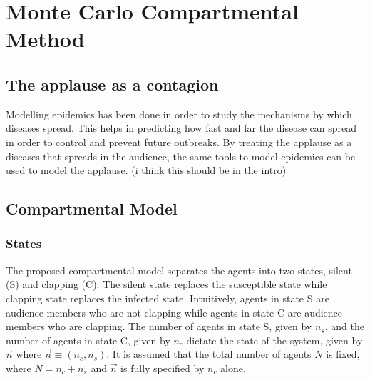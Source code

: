 \chapter{Monte Carlo Compartmental Method}
\label{chap2}
\def\a{(n \pi p)}
\def\aa{(\bar{n} \pi p)}
\def\b{kpL}
\def\c{k(1-p)L}
\def\s{\\sin{(\bar{n}\pi p)}}
\def\c{\\cos{(\bar{n}\pi p)}}
\def\statepsi{\mid \psi \; \rangle}
\def\energy{\mid E_{\vec{k}} \; \rangle}
\def\psixt{\mid \psi(x,t) \; \rangle}
\def\statepsixtrev{\mid \psi(x,t=T_{rev}) \; \rangle}
\def\statepsixt0{\mid \psi(x,t=0) \; \rangle}
\def\lowering{S^-_l \mid 0 \; \rangle}
\def\loweringa{S^-_m \; S^-_l \mid 0 \; \rangle}


\section{The applause as a contagion}
\hspace{\parindent} Modelling epidemics has been done in order to study the mechanisms by which diseases spread. This helps in predicting how fast and far the disease can spread in order to control and prevent future outbreaks. By treating the applause as a diseases that spreads in the audience, the same tools to model epidemics can be used to model the applause. (i think this should be in the intro)

\section{Compartmental Model}
\subsection{States}

The proposed compartmental model separates the agents into two states, silent (S) and clapping (C). The silent state replaces the susceptible state while clapping state replaces the infected state. 
Intuitively, agents in state S are audience members who are not clapping while agents in state C are audience members who are clapping.
The number of agents in state S, given by $n_{s}$, and the number of agents in state C, given by $n_{c}$ dictate the state of the system, given by $\vec{n}$ where $\vec{n}\equiv(n_{c},n_{s})$.
It is assumed that the total number of agents $N$ is fixed, where $N = n_{c} + n_{s}$ and $\vec{n}$ is fully specified by $n_{c}$ alone.

